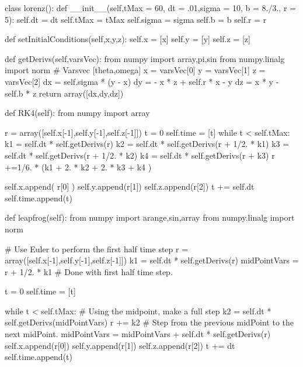 \begin{codeexample}
\begin{VerbatimOut}{\listingFile}
class lorenz():
    def __init__(self,tMax = 60, dt = .01,sigma = 10, b = 8./3., r = 5):
        self.dt = dt
        self.tMax = tMax
        self.sigma = sigma
        self.b = b
        self.r = r
        
    def setInitialConditions(self,x,y,z):
        self.x = [x]
        self.y = [y]
        self.z = [z]
        
    def getDerivs(self,varsVec):
        from numpy import array,pi,sin
        from numpy.linalg import norm
        # Varsvec [theta,omega]
        x = varsVec[0]
        y = varsVec[1]
        z = varsVec[2]
        dx = self.sigma * (y - x) 
        dy = - x * z + self.r * x - y 
        dz = x * y - self.b * z
        return array([dx,dy,dz])


    def RK4(self):
        from numpy import array

        r = array([self.x[-1],self.y[-1],self.z[-1]])
        t = 0
        self.time = [t]
        while t < self.tMax:
            k1 = self.dt * self.getDerivs(r)
            k2 = self.dt * self.getDerivs(r + 1/2. * k1)
            k3 = self.dt * self.getDerivs(r + 1/2. * k2)
            k4 = self.dt * self.getDerivs(r + k3)
            r  +=1/6. * (k1 + 2. * k2 + 2. * k3 + k4 )

            self.x.append( r[0]  )
            self.y.append(r[1])
            self.z.append(r[2])
            t += self.dt
            self.time.append(t)


    def leapfrog(self):
        from numpy import arange,sin,array
        from numpy.linalg import norm

        # Use Euler to perform the first half time step
        r = array([self.x[-1],self.y[-1],self.z[-1]])
        k1 = self.dt * self.getDerivs(r)
        midPointVars = r + 1/2. * k1
        # Done with first half time step.

        t = 0
        self.time = [t]
        
        while t < self.tMax:
            # Using the midpoint, make a full step
            k2 = self.dt * self.getDerivs(midPointVars)
            r += k2
            # Step from the previous midPoint to the next midPoint.
            midPointVars = midPointVars + self.dt * self.getDerivs(r)
            self.x.append(r[0])
            self.y.append(r[1])
            self.z.append(r[2])
            t += dt
            self.time.append(t)
            



\end{VerbatimOut}
\end{codeexample}
